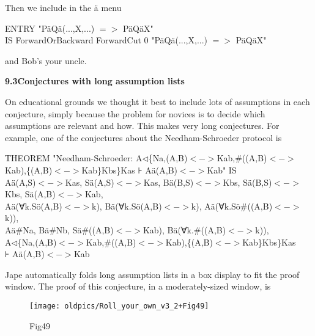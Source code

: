 Then we include in the \"{a} menu

ENTRY "P\"{a}Q\"{a}(...,X,...) $=>$ P\"{a}Q\"{a}X"\\
\tab IS ForwardOrBackward ForwardCut 0 "P\"{a}Q\"{a}(...,X,...) $=>$ P\"{a}Q\"{a}X"


and Bob's your uncle.


\textbf{{\large 9.3\tab Conjectures with long assumption lists}}


On educational grounds we thought it best to include lots of assumptions in each conjecture, simply because the problem for novices is to decide which assumptions are relevant and how. This makes very long conjectures. For example, one of the conjectures about the Needham-Schroeder protocol is

{\small THEOREM "Needham-Schroeder: A$\triangleleft$\{Na,(A,B)$<->$Kab,\#((A,B)$<->$Kab),\{(A,B)$<->$Kab\}Kbs\}Kas ⊦ A\"{a}(A,B)$<->$Kab" IS  \\
\tab \tab A\"{a}(A,S)$<->$Kas, S\"{a}(A,S)$<->$Kas, B\"{a}(B,S)$<->$Kbs, S\"{a}(B,S)$<->$Kbs, S\"{a}(A,B)$<->$Kab,\\
\tab \tab A\"{a}(∀k.S\"{o}(A,B)$<->$k), B\"{a}(∀k.S\"{o}(A,B)$<->$k), A\"{a}(∀k.S\"{o}\#((A,B)$<->$k)), \\
\tab \tab A\"{a}\#Na, B\"{a}\#Nb, S\"{a}\#((A,B)$<->$Kab), B\"{a}(∀k.\#((A,B)$<->$k)), \\
\tab \tab A$\triangleleft$\{Na,(A,B)$<->$Kab,\#((A,B)$<->$Kab),\{(A,B)$<->$Kab\}Kbs\}Kas \\
\tab \tab ⊦ A\"{a}(A,B)$<->$Kab}


Jape automatically folds long assumption lists in a box display to fit the proof window. The proof of this conjecture, in a moderately-sized window, is

\begin{figure}[htbp] \begin{center} \texttt{[image: oldpics/Roll\_your\_own\_v3\_2+Fig49]} \caption{Fig49} \end{center} \end{figure}

 